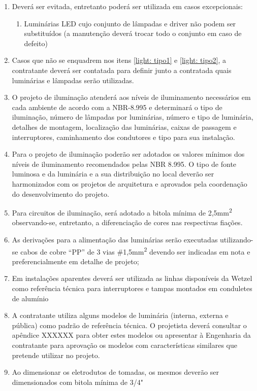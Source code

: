 \begin{enumerate}
	\item Deverá ser evitada, entretanto poderá ser utilizada em casos excepcionais:\label{light: tipo2}
	\begin{enumerate} 
		
		\item Luminárias LED cujo conjunto de lâmpadas e driver não podem ser substituídos (a manutenção deverá trocar todo o conjunto em caso de defeito)		
	\end{enumerate}

	\item Casos que não se enquadrem nos itens \ref{light: tipo1} e \ref{light: tipo2}, a contratante deverá ser contatada para definir junto a contratada quais luminárias e lâmpadas serão utilizadas.

	\item O projeto de iluminação atenderá aos níveis de iluminamento necessários em cada ambiente de acordo com a NBR-8.995 e determinará o tipo de iluminação, número de lâmpadas por luminárias, número e tipo de luminária, detalhes de montagem, localização das luminárias, caixas de passagem e interruptores, caminhamento dos condutores e tipo para sua instalação. 
	
	\item Para o projeto de iluminação poderão ser adotados os valores mínimos dos níveis de iluminamento recomendados pelas NBR 8.995. O tipo de fonte luminosa e da luminária e a sua distribuição no local deverão ser harmonizados com os projetos de arquitetura e aprovados pela coordenação do desenvolvimento do projeto.
	
	\item \label{lighting: bitola minima} Para circuitos de iluminação, será adotado a bitola mínima de 2,5mm\textsuperscript{2} observando-se, entretanto, a diferenciação de cores nas respectivas fiações.
	
	\item As derivações para a alimentação das luminárias serão executadas utilizando-se cabos de cobre “PP” de 3 vias \#1,5mm\textsuperscript{2} devendo ser indicadas em nota e preferencialmente em detalhe de projeto;
	
	\item Em instalações aparentes deverá ser utilizada as linhas disponíveis da Wetzel como referência técnica para interruptores e tampas montados em conduletes de alumínio
	
	\item A contratante utiliza alguns modelos de luminária (interna, externa e pública) como padrão de referência técnica. O projetista deverá consultar o apêndice XXXXXX para obter estes modelos ou apresentar à Engenharia da contratante para aprovação os modelos com características similares que pretende utilizar no projeto.
	
	\item Ao dimensionar os eletrodutos de tomadas, os mesmos deverão ser dimensionados com bitola mínima de 3/4"%
\end{enumerate}